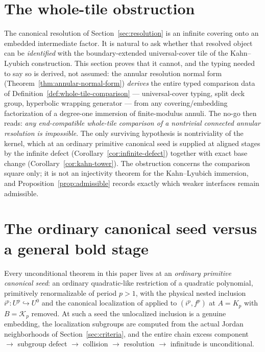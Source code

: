 \documentclass[11pt,reqno]{amsart}
\theoremstyle{definition}
\theoremstyle{remark}
\begin{document}

\section{The whole-tile obstruction}
\label{sec:wholetile}

The canonical resolution of Section~\ref{sec:resolution} is an infinite
covering onto an embedded intermediate factor.  It is natural to ask
whether that resolved object can be \emph{identified} with the
boundary-extended universal-cover tile of the Kahn--Lyubich
construction.  This section proves that it cannot, and the typing
needed to say so is derived, not assumed: the annular resolution
normal form (Theorem~\ref{thm:annular-normal-form}) \emph{derives} the
entire typed comparison data of
Definition~\ref{def:whole-tile-comparison} --- universal-cover typing,
split deck group, hyperbolic wrapping generator --- from any
covering/embedding factorization of a degree-one immersion of
finite-modulus annuli.  The no-go then reads: \emph{any end-compatible
whole-tile comparison of a nontrivial connected annular resolution is
impossible}.  The only surviving hypothesis is nontriviality of the
kernel, which at an ordinary primitive canonical seed is supplied at
aligned stages by the infinite defect
(Corollary~\ref{cor:infinite-defect}) together with exact base change
(Corollary~\ref{cor:kahn-tower}).  The obstruction concerns the
comparison
square only; it is not an injectivity theorem for the Kahn--Lyubich
immersion, and Proposition~\ref{prop:admissible} records exactly which
weaker interfaces remain admissible.




\section{The ordinary canonical seed versus a general bold stage}
\label{sec:seedvsbold}

Every unconditional theorem in this paper lives at an \emph{ordinary
primitive canonical seed}: an ordinary quadratic-like restriction of a
quadratic polynomial, primitively renormalizable of period $p>1$, with
the physical nested inclusion $i^{p}\colon U^{p}\hookrightarrow U^{0}$
and the canonical localization of \cite{KahnPrimitive06} applied to
$(i^{p},f^{p})$ at $A=K_{p}$ with $B=\mathcal K_{p}$ removed.  At such
a seed the unlocalized inclusion is a genuine embedding, the
localization subgroups are computed from the actual Jordan
neighborhoods of Section~\ref{sec:criteria}, and the entire chain
excess component $\to$ subgroup defect $\to$ collision $\to$ resolution
$\to$ infinitude is unconditional.
\end{document}
